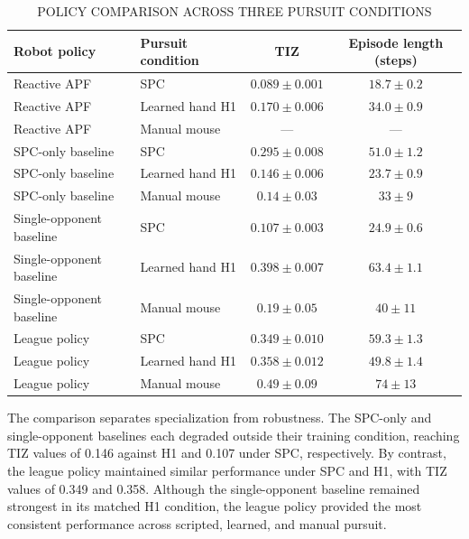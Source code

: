 \documentclass[journal,twoside,web]{ieeecolor2}
\begin{document}
\begin{table}[!t]
\caption{POLICY COMPARISON ACROSS THREE PURSUIT CONDITIONS}
\label{tab:policy-comparison}
\centering
\footnotesize
\setlength{\tabcolsep}{5pt}
\renewcommand{\arraystretch}{1.08}
\begin{tabularx}{\textwidth}{@{}>{\raggedright\arraybackslash}X >{\raggedright\arraybackslash}X c c@{}}
\toprule
Robot policy & Pursuit condition & TIZ & Episode length (steps) \\
\midrule
Reactive APF & SPC & $0.089 \pm 0.001$ & $18.7 \pm 0.2$ \\
Reactive APF & Learned hand H1 & $0.170 \pm 0.006$ & $34.0 \pm 0.9$ \\
Reactive APF & Manual mouse & --- & --- \\
SPC-only baseline & SPC & $0.295 \pm 0.008$ & $51.0 \pm 1.2$ \\
SPC-only baseline & Learned hand H1 & $0.146 \pm 0.006$ & $23.7 \pm 0.9$ \\
SPC-only baseline & Manual mouse & $0.14 \pm 0.03$ & $33 \pm 9$ \\
Single-opponent baseline & SPC & $0.107 \pm 0.003$ & $24.9 \pm 0.6$ \\
Single-opponent baseline & Learned hand H1 & $0.398 \pm 0.007$ & $63.4 \pm 1.1$ \\
Single-opponent baseline & Manual mouse & $0.19 \pm 0.05$ & $40 \pm 11$ \\
League policy & SPC & $0.349 \pm 0.010$ & $59.3 \pm 1.3$ \\
League policy & Learned hand H1 & $0.358 \pm 0.012$ & $49.8 \pm 1.4$ \\
League policy & Manual mouse & $0.49 \pm 0.09$ & $74 \pm 13$ \\
\bottomrule
\end{tabularx}
\end{table}

The comparison separates specialization from robustness. The SPC-only and single-opponent baselines each degraded outside their training condition, reaching TIZ values of 0.146 against H1 and 0.107 under SPC, respectively. By contrast, the league policy maintained similar performance under SPC and H1, with TIZ values of 0.349 and 0.358. Although the single-opponent baseline remained strongest in its matched H1 condition, the league policy provided the most consistent performance across scripted, learned, and manual pursuit.
\end{document}
